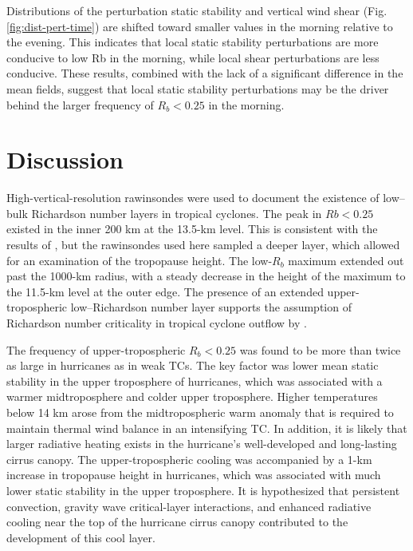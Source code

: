 Distributions of the perturbation static stability and vertical wind shear (Fig. \ref{fig:dist-pert-time}) are shifted toward smaller values in the morning relative to the evening.
This indicates that local static stability perturbations are more conducive to low Rb in the morning, while local shear perturbations are less conducive.
These results, combined with the lack of a significant difference in the mean fields, suggest that local static stability perturbations may be the driver behind the larger frequency of $R_b < 0.25$ in the morning.

\section{Discussion}
\label{sec:discussion}

High-vertical-resolution rawinsondes were used to document the existence of low–bulk Richardson number layers in tropical cyclones.
The peak in $Rb < 0.25$ existed in the inner 200 km at the 13.5-km level.
This is consistent with the results of \cite{Molinarietal2014}, but the rawinsondes used here sampled a deeper layer, which allowed for an examination of the tropopause height.
The low-$R_b$ maximum extended out past the 1000-km radius, with a steady decrease in the height of the maximum to the 11.5-km level at the outer edge.
The presence of an extended upper-tropospheric low--Richardson number layer supports the assumption of Richardson number criticality in tropical cyclone outflow by \cite{EmanuelRotunno2011}.

The frequency of upper-tropospheric $R_b < 0.25$ was found to be more than twice as large in hurricanes as in weak TCs.
The key factor was lower mean static stability in the upper troposphere of hurricanes, which was associated with a warmer midtroposphere and colder upper troposphere.
Higher temperatures below 14 km arose from the midtropospheric warm anomaly that is required to maintain thermal wind balance in an intensifying TC.
In addition, it is likely that larger radiative heating exists in the hurricane’s well-developed and long-lasting cirrus canopy.
The upper-tropospheric cooling was accompanied by a 1-km increase in tropopause height in hurricanes, which was associated with much lower static stability in the upper troposphere.
It is hypothesized that persistent convection, gravity wave critical-layer interactions, and enhanced radiative cooling near the top of the hurricane cirrus canopy contributed to the development of this cool layer.


